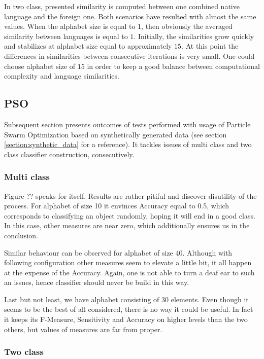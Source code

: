 \documentclass{mini}
\begin{document}
\makeFigureSyntheticAvgSimlarity

In two class, presented similarity is computed between one combined native language and the foreign one. Both scenarios have resulted with almost the same values. When the alphabet size is equal to $1$, then obviously the averaged similarity between languages is equal to $1$. Initially, the similarities grow quickly and stabilizes at alphabet size equal to approximately $15$. At this point the differences in similarities between consecutive iterations is very small. One could choose alphabet size of $15$ in order to keep a good balance between computational complexity and language similarities.
%
%
\subsection{PSO}
Subsequent section presents outcomes of tests performed with usage of Particle Swarm Optimization based on synthetically generated data (see section \ref{section:synthetic_data} for a reference). It tackles issues of multi class and two class classifier construction, consecutively.

\subsubsection{Multi class}
Figure ?? speaks for itself. Results are rather pitiful and discover disutility of the process. For alphabet of size 10 it envinces Accuracy equal to 0.5, which corresponds to classifying an object randomly, hoping it will end in a good class. In this case, other measures are near zero, which additionally ensures us in the conclusion. 

Similar behaviour can be observed for alphabet of size 40. Although with following configuration other measures seem to elevate a little bit, it all happen at the expense of the Accuracy. Again, one is not able to turn a deaf ear to such an issues, hence classifier should never be build in this way.

Last but not least, we have alphabet consisting of 30 elements. Even though it seems to be the best of all considered, there is no way it could be useful. In fact it keeps its F-Measure, Sensitivity and Accuracy on higher levels than the two others, but values of measures are far from proper. 
\makeFigureSyntheticMulti

\subsubsection{Two class}
\end{document}
